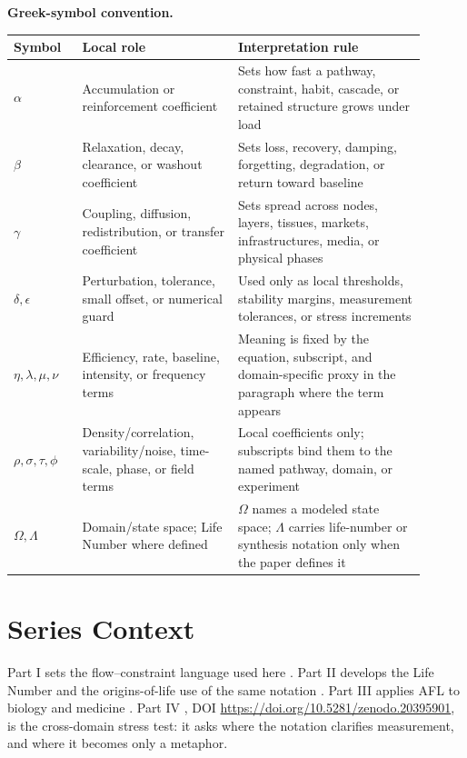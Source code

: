 \documentclass[11pt,a4paper]{article}
\begin{document}
\noindent\textbf{Greek-symbol convention.}
\begin{center}
{\small
\begin{tabular}{p{0.15\linewidth}p{0.34\linewidth}p{0.41\linewidth}}
\hline
Symbol & Local role & Interpretation rule \\
\hline
$\alpha$ & Accumulation or reinforcement coefficient & Sets how fast a pathway, constraint, habit, cascade, or retained structure grows under load \\
$\beta$ & Relaxation, decay, clearance, or washout coefficient & Sets loss, recovery, damping, forgetting, degradation, or return toward baseline \\
$\gamma$ & Coupling, diffusion, redistribution, or transfer coefficient & Sets spread across nodes, layers, tissues, markets, infrastructures, media, or physical phases \\
$\delta,\epsilon$ & Perturbation, tolerance, small offset, or numerical guard & Used only as local thresholds, stability margins, measurement tolerances, or stress increments \\
$\eta,\lambda,\mu,\nu$ & Efficiency, rate, baseline, intensity, or frequency terms & Meaning is fixed by the equation, subscript, and domain-specific proxy in the paragraph where the term appears \\
$\rho,\sigma,\tau,\phi$ & Density/correlation, variability/noise, time-scale, phase, or field terms & Local coefficients only; subscripts bind them to the named pathway, domain, or experiment \\
$\Omega,\Lambda$ & Domain/state space; Life Number where defined & $\Omega$ names a modeled state space; $\Lambda$ carries life-number or synthesis notation only when the paper defines it \\
\hline
\end{tabular}
}
\end{center}

\section{Series Context}

Part I sets the flow--constraint language used here \cite{MujjabiPartI2026}. Part II develops the Life Number and the origins-of-life use of the same notation \cite{MujjabiPartII2026}. Part III applies AFL to biology and medicine \cite{MujjabiPartIII2026}. Part IV \cite{MujjabiPartIV2026}, DOI \url{https://doi.org/10.5281/zenodo.20395901}, is the cross-domain stress test: it asks where the notation clarifies measurement, and where it becomes only a metaphor.
\end{document}
